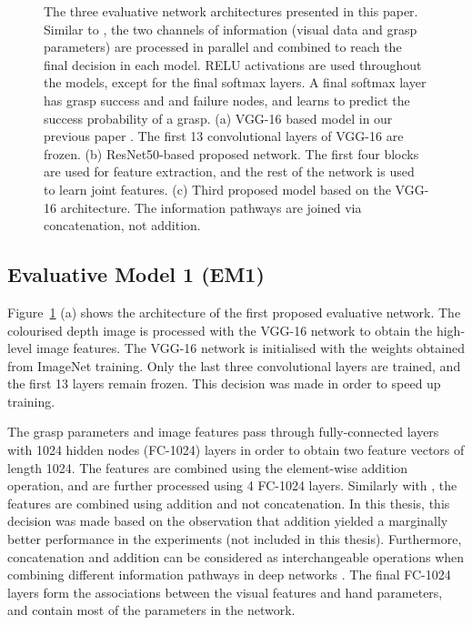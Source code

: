 \begin{figure}[t]
\caption{The three evaluative network architectures presented in this paper. Similar to \cite{Levine1}, the two channels of information (visual data and grasp parameters) are processed in parallel and combined to reach the final decision in each model. RELU activations are used throughout the models, except for the final softmax layers. A final softmax layer has grasp success and and failure nodes, and learns to predict the success probability of a grasp. (a) VGG-16 based model in our previous paper \cite{icra}. The first 13 convolutional layers of VGG-16 are frozen. (b) ResNet50-based \cite{HeZRS15} proposed network. The first four blocks are used for feature extraction, and the rest of the network is used to learn joint features. (c) Third proposed model based on the VGG-16 architecture. The information pathways are joined via concatenation, not addition.
\label{fig:networkArchitecture2}}
\end{figure}

\subsection{Evaluative Model 1 (EM1)}

Figure~\ref{fig:networkArchitecture2} (a) shows the architecture of the first proposed evaluative network. The colourised depth image is processed with the VGG-16 network \cite{Simonyan14c} to obtain the high-level image features. The VGG-16 network is initialised with the weights obtained from ImageNet training. Only the last three convolutional layers are trained, and the first 13 layers remain frozen. This decision was made in order to speed up training.

The grasp parameters and image features pass through fully-connected layers with 1024 hidden nodes (FC-1024) layers in order to obtain two feature vectors of length 1024. The features are combined using the element-wise addition operation, and are further processed using 4 FC-1024 layers. Similarly with \cite{Levine1}, the features are combined using addition and not concatenation. In this thesis, this decision was made based on the observation that addition yielded a marginally better performance in the experiments (not included in this thesis). Furthermore, concatenation and addition can be considered as interchangeable operations when combining different information pathways in deep networks \cite{dumoulin2018feature-wise}. The final FC-1024 layers form the associations between the visual features and hand parameters, and contain most of the parameters in the network. 

